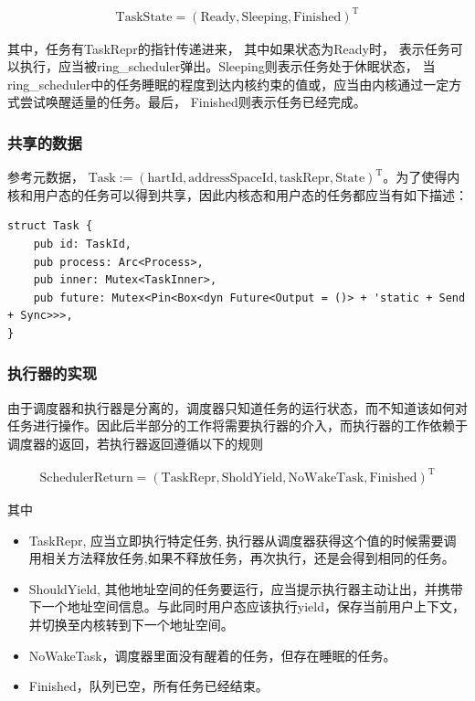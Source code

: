 \begin{equation}
    \label{equation:c3taskstate}
    \begin{aligned}
\boldsymbol{\mathrm{TaskState}} = (\mathrm{Ready}, \mathrm{Sleeping}, \mathrm{Finished})^{\mathrm{T}}
    \end{aligned}
\end{equation}

其中，任务有TaskRepr的指针传递进来， 其中如果状态为Ready时， 表示任务可以执行，应当被ring\_scheduler弹出。Sleeping则表示任务处于休眠状态， 当ring\_scheduler中的任务睡眠的程度到达内核约束的值或，应当由内核通过一定方式尝试唤醒适量的任务。最后， Finished则表示任务已经完成。

\subsubsection{共享的数据}

参考元数据， $\boldsymbol{\mathrm{Task}} := (\mathrm{hartId}, \mathrm{addressSpaceId}, \mathrm{taskRepr}, \mathrm{State})^{\mathrm{T}}$。为了使得内核和用户态的任务可以得到共享，因此内核态和用户态的任务都应当有如下描述：

\begin{lstlisting}
struct Task {
    pub id: TaskId,
    pub process: Arc<Process>,
    pub inner: Mutex<TaskInner>,
    pub future: Mutex<Pin<Box<dyn Future<Output = ()> + 'static + Send + Sync>>>, 
}
\end{lstlisting}

\subsubsection{执行器的实现}

由于调度器和执行器是分离的，调度器只知道任务的运行状态，而不知道该如何对任务进行操作。因此后半部分的工作将需要执行器的介入，而执行器的工作依赖于调度器的返回，若执行器返回遵循以下的规则

\begin{equation}
    \label{equation:c3schedulerreturn}
    \begin{aligned}
\boldsymbol{\mathrm{SchedulerReturn}} = (\mathrm{TaskRepr}, \mathrm{SholdYield}, \mathrm{NoWakeTask}, \mathrm{Finished})^{\mathrm{T}}
    \end{aligned}
\end{equation}

其中

\begin{itemize}
    \item TaskRepr, 应当立即执行特定任务, 执行器从调度器获得这个值的时候需要调用相关方法释放任务,如果不释放任务，再次执行，还是会得到相同的任务。
    \item ShouldYield, 其他地址空间的任务要运行，应当提示执行器主动让出，并携带下一个地址空间信息。与此同时用户态应该执行yield，保存当前用户上下文，并切换至内核转到下一个地址空间。
    \item  NoWakeTask，调度器里面没有醒着的任务，但存在睡眠的任务。
    \item  Finished，队列已空，所有任务已经结束。
\end{itemize}


